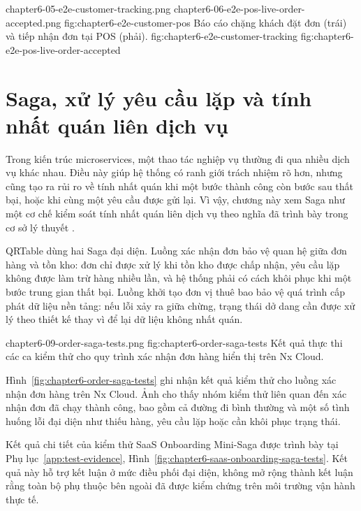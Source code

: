   {chapter6-05-e2e-customer-tracking.png}
  {chapter6-06-e2e-pos-live-order-accepted.png}
  {fig:chapter6-e2e-customer-pos}
  {Báo cáo chặng khách đặt đơn (trái) và tiếp nhận đơn tại POS (phải).}
  {fig:chapter6-e2e-customer-tracking}
  {fig:chapter6-e2e-pos-live-order-accepted}
\section{Saga, xử lý yêu cầu lặp và tính nhất quán liên dịch vụ}

Trong kiến trúc microservices, một thao tác nghiệp vụ thường đi qua nhiều dịch vụ khác nhau. Điều này giúp hệ thống có ranh giới trách nhiệm rõ hơn, nhưng cũng tạo ra rủi ro về tính nhất quán khi một bước thành công còn bước sau thất bại, hoặc khi cùng một yêu cầu được gửi lại. Vì vậy, chương này xem Saga như một cơ chế kiểm soát tính nhất quán liên dịch vụ theo nghĩa đã trình bày trong cơ sở lý thuyết \cite{garcia-molina-sagas-1987,richardson-microservices-patterns-2018}.

QRTable dùng hai Saga đại diện. Luồng xác nhận đơn bảo vệ quan hệ giữa đơn hàng và tồn kho: đơn chỉ được xử lý khi tồn kho được chấp nhận, yêu cầu lặp không được làm trừ hàng nhiều lần, và hệ thống phải có cách khôi phục khi một bước trung gian thất bại. Luồng khởi tạo đơn vị thuê bao bảo vệ quá trình cấp phát dữ liệu nền tảng: nếu lỗi xảy ra giữa chừng, trạng thái dở dang cần được xử lý theo thiết kế thay vì để lại dữ liệu không nhất quán.

  {chapter6-09-order-saga-tests.png}
  {fig:chapter6-order-saga-tests}
  {Kết quả thực thi các ca kiểm thử cho quy trình xác nhận đơn hàng hiển thị trên Nx Cloud.}

Hình~\ref{fig:chapter6-order-saga-tests} ghi nhận kết quả kiểm thử cho luồng xác nhận đơn hàng trên Nx Cloud. Ảnh cho thấy nhóm kiểm thử liên quan đến xác nhận đơn đã chạy thành công, bao gồm cả đường đi bình thường và một số tình huống lỗi đại diện như thiếu hàng, yêu cầu lặp hoặc cần khôi phục trạng thái.

Kết quả chi tiết của kiểm thử SaaS Onboarding Mini-Saga được trình bày tại Phụ lục~\ref{app:test-evidence}, Hình~\ref{fig:chapter6-saas-onboarding-saga-tests}. Kết quả này hỗ trợ kết luận ở mức điều phối đại diện, không mở rộng thành kết luận rằng toàn bộ phụ thuộc bên ngoài đã được kiểm chứng trên môi trường vận hành thực tế.

